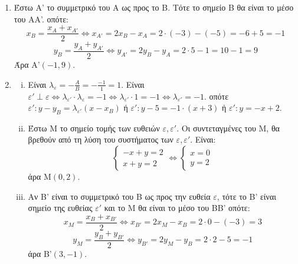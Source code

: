 \begin{enumerate}[\text{α)}]
    \item Έστω A' το συμμετρικό του A ως προς το B. Τότε το σημείο B θα είναι το μέσο του AA'.
    οπότε:
    \[ x_B = \frac{x_A + x_{A'}}{2} \Leftrightarrow x_{A'} = 2x_B - x_A = 2 \cdot (-3) - (-5) = -6 + 5 = -1 \]
    \[ y_B = \frac{y_A + y_{A'}}{2} \Leftrightarrow y_{A'} = 2y_B - y_A = 2 \cdot 5 - 1 = 10 - 1 = 9 \]
    Άρα A'$(-1, 9)$.

    \item
    \begin{enumerate}[i.]
        \item Είναι $\lambda_{\varepsilon} = -\frac{A}{B} = -\frac{-1}{1} = 1$.
        Είναι $\varepsilon' \perp \varepsilon \Leftrightarrow \lambda_{\varepsilon'} \cdot \lambda_{\varepsilon} = -1 \Leftrightarrow \lambda_{\varepsilon'} \cdot 1 = -1 \Leftrightarrow \lambda_{\varepsilon'} = -1$.
        οπότε $\varepsilon': y - y_B = \lambda_{\varepsilon'}(x - x_B)$ ή $\varepsilon': y - 5 = -1 \cdot (x + 3)$ ή $\varepsilon': y = -x + 2$.

        \item Έστω M το σημείο τομής των ευθειών $\varepsilon, \varepsilon'$. Οι συντεταγμένες του M, θα βρεθούν από τη λύση του συστήματος των $\varepsilon, \varepsilon'$.
        Είναι:
        \[ \begin{cases} -x + y = 2 \\ x + y = 2 \end{cases} \Leftrightarrow \begin{cases} x = 0 \\ y = 2 \end{cases} \]
        άρα M$(0, 2)$.

        \item Αν B' είναι το συμμετρικό του B ως προς την ευθεία $\varepsilon$, τότε το B' είναι σημείο της ευθείας $\varepsilon'$ και το M θα είναι το μέσο του BB' οπότε:
        \[ x_M = \frac{x_B + x_{B'}}{2} \Leftrightarrow x_{B'} = 2x_M - x_B = 2 \cdot 0 - (-3) = 3 \]
        \[ y_M = \frac{y_B + y_{B'}}{2} \Leftrightarrow y_{B'} = 2y_M - y_B = 2 \cdot 2 - 5 = -1 \]
        άρα B'$(3, -1)$.
    \end{enumerate}
\end{enumerate}